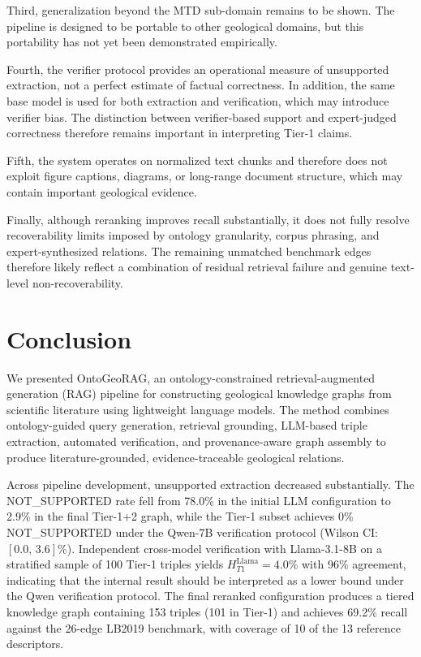 \documentclass[10pt]{article}
\newcommand{\method}{OntoGeoRAG}
\newcommand{\WI}[2]{\ensuremath{[#1{,}\,#2]\%}}
\begin{document}
Third, generalization beyond the MTD sub-domain remains to be shown.
The pipeline is designed to be portable to other geological domains,
but this portability has not yet been demonstrated empirically.

Fourth, the verifier protocol provides an operational measure of
unsupported extraction, not a perfect estimate of factual correctness.
In addition, the same base model is used for both extraction and
verification, which may introduce verifier bias.
The distinction between verifier-based support and expert-judged
correctness therefore remains important in interpreting Tier-1 claims.

Fifth, the system operates on normalized text chunks and therefore
does not exploit figure captions, diagrams, or long-range document
structure, which may contain important geological evidence.

Finally, although reranking improves recall substantially, it does not
fully resolve recoverability limits imposed by ontology granularity,
corpus phrasing, and expert-synthesized relations.
The remaining unmatched benchmark edges therefore likely reflect a
combination of residual retrieval failure and genuine text-level
non-recoverability.
\section{Conclusion}
\label{sec:conclusion}

We presented \method{}, an ontology-constrained retrieval-augmented
generation (RAG) pipeline for constructing geological knowledge
graphs from scientific literature using lightweight language models.
The method combines ontology-guided query generation, retrieval
grounding, LLM-based triple extraction, automated verification, and
provenance-aware graph assembly to produce literature-grounded,
evidence-traceable geological relations.

Across pipeline development, unsupported extraction decreased
substantially.
The NOT\_SUPPORTED rate fell from 78.0\% in the initial LLM
configuration to 2.9\% in the final Tier-1+2 graph, while the Tier-1 subset achieves 0\% NOT\_SUPPORTED under the
Qwen-7B verification protocol (Wilson CI: \WI{0.0}{3.6}).
Independent cross-model verification with
Llama-3.1-8B on a stratified sample of 100 Tier-1 triples
yields $H_{T1}^{\text{Llama}} = 4.0\%$ with 96\% agreement,
indicating that the internal result should be interpreted
as a lower bound under the Qwen verification protocol.
The final reranked configuration produces a tiered knowledge graph
containing 153 triples (101 in Tier-1) and achieves 69.2\% recall
against the 26-edge LB2019 benchmark, with coverage of 10 of the
13 reference descriptors.
\end{document}
